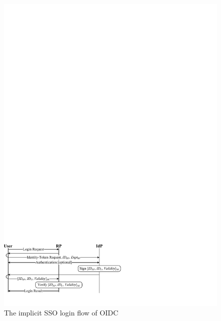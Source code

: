 \begin{figure}[t]
  \centering
  \includegraphics[width=0.95\linewidth]{fig/OIDC.pdf}
  \caption{The implicit SSO login flow of OIDC}
  \label{fig:OpenID}
\end{figure}

